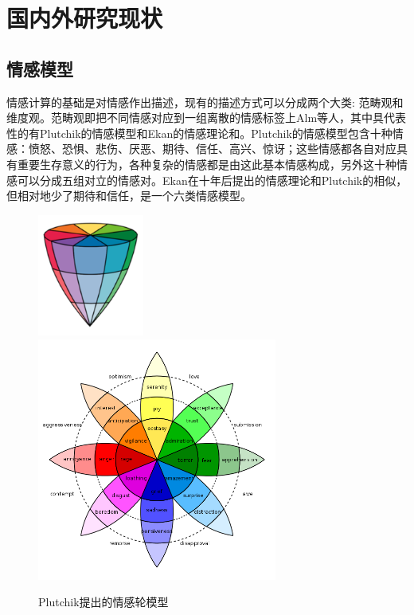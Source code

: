 \section{国内外研究现状}

\subsection{情感模型}

情感计算的基础是对情感作出描述，现有的描述方式可以分成两个大类: 范畴观和维度观。范畴观即把不同情感对应到一组离散的情感标签上Alm等人\cite{Alm2005Emotions}，其中具代表性的有Plutchik的情感模型\cite{Plutchik1980Emo}和Ekan的情感理论\cite{Ekman1992An}和。Plutchik的情感模型包含十种情感：愤怒、恐惧、悲伤、厌恶、期待、信任、高兴、惊讶；这些情感都各自对应具有重要生存意义的行为，各种复杂的情感都是由这此基本情感构成，另外这十种情感可以分成五组对立的情感对。Ekan在十年后提出的情感理论和Plutchik的相似，但相对地少了期待和信任，是一个六类情感模型。

\begin{figure}[h]
  \centering%
    {\includegraphics[height=4cm]{img/plutchik_3d.png}}%
  \hspace{4em}%
      {\includegraphics[height=8cm]{img/plutchik_2d.png}}
  \caption{Plutchik\cite{Plutchik1980Emo}提出的情感轮模型}
  \label{fig:plutchik_emotion_wheel}
\end{figure}

